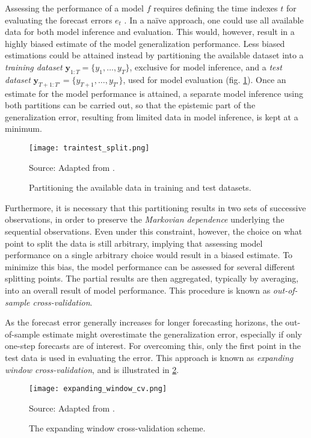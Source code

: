 Assessing the performance of a model $f$ requires defining the time indexes $t$ for evaluating the forecast errors $e_{t}$ . In a naïve approach, one could use all available data for both model inference and evaluation. This would, however, result in a highly biased estimate of the model generalization performance. Less biased estimations could be attained instead by partitioning the available dataset into a \textit{training dataset} $\boldsymbol{y} _{1:T} = \{y_1,…,y_T\}$, exclusive for model inference, and a \textit{test dataset} $\boldsymbol{y} _{T+1:T'} = \{y_{T+1},…,y_{T'}\}$, used for model evaluation (fig. \ref{fig:training_test_split}). Once an estimate for the model performance is attained, a separate model inference using both partitions can be carried out, so that the epistemic part of the generalization error, resulting from limited data in model inference, is kept at a minimum.
\begin{figure}[H]%
	\centering
    \caption{Partitioning the available data in training and test datasets.}
    \texttt{[image: traintest\_split.png]} \\
    \raggedright
    Source: Adapted from \cite{krispin2019handson}.
	\label{fig:training_test_split}
\end{figure}

Furthermore, it is necessary that this partitioning results in two sets of successive observations, in order to preserve the \textit{Markovian dependence} underlying the sequential observations. Even under this constraint, however, the choice on what point to split the data is still arbitrary, implying that assessing model performance on a single arbitrary choice would result in a biased estimate. To minimize this bias, the model performance can be assessed for several different splitting points. The partial results are then aggregated, typically by averaging, into an overall result of model performance. This procedure is known as \textit{out-of-sample cross-validation}.

As the forecast error generally increases for longer forecasting horizons, the out-of-sample estimate might overestimate the generalization error, especially if only one-step forecasts are of interest. For overcoming this, only the  first point in the test data is used in evaluating the error. This approach is known as \textit{expanding window cross-validation}, and is illustrated in \ref{fig:expanding_window_cv}.
\begin{figure}[H]%
	\centering
    \caption{The expanding window cross-validation scheme.}
    \texttt{[image: expanding\_window\_cv.png]} \\
    \raggedright
    Source: Adapted from \cite{krispin2019handson}.
	\label{fig:expanding_window_cv}
\end{figure}


